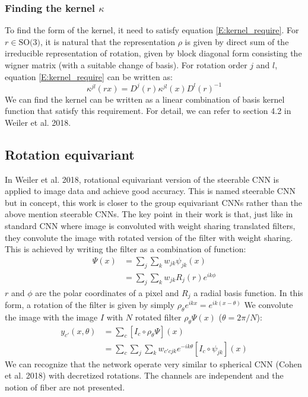 \documentclass{article}
\begin{document}
\subsubsection*{Finding the kernel $\kappa$}
To find the form of the kernel, it need to satisfy equation \ref{E:kernel_require}. For $r \in \text{SO(3)}$, 
it is natural that the representation $\rho$ is given by direct sum of the irreducible representation of rotation,
given by block diagonal form consisting the wigner matrix (with a suitable change of basis). 
For rotation order $j$ and $l$, equation \ref{E:kernel_require}
can be written as:
\begin{equation}
    \kappa^{jl}(rx) = D^{j}(r) \kappa^{jl}(x) D^l(r)^{-1}
\end{equation}
We can find the kernel can be written as a linear combination of basis kernel function that satisfy this requirement. 
For detail, we can refer to section 4.2 in Weiler et al. 2018.

\subsection*{Rotation equivariant}
In Weiler et al. 2018, rotational equivariant version of the steerable CNN is applied to image data and achieve good accuracy. 
This is named steerable CNN but in concept, this work is closer to the group equivariant CNNs rather than the above mention steerable CNNs. 
The key point in their work is that, just like in standard CNN where image is convoluted with weight sharing translated filters, 
they convolute the image with rotated version of the filter with weight sharing. 
This is achieved by writing the filter as a combination of function:
\begin{align*}
    \Psi(x) &= \sum_j \sum_k w_{jk}\psi_{jk}(x) \\
            &= \sum_j \sum_k w_{jk} R_j(r) e^{ik\phi}
\end{align*}
$r$ and $\phi$ are the polar coordinates of a pixel and $R_j$ a radial basis function. In this form, a rotation 
of the filter is given by simply $\rho_{\theta}e^{ikx} = e^{ik(x-\theta)}$
We convolute the image with the image $I$ with $N$ rotated filter $\rho_{\theta}\Psi(x)$ ($\theta = 2\pi / N$):
\begin{align*}
    y_{c'}(x,\theta) &= \sum_c [ I_c \circ \rho_{\theta}\Psi ] (x) \\
        &= \sum_c \sum_j \sum_k w_{c'cjk} e^{-ik\theta} [I_c \circ \psi_{jk}](x)
\end{align*}
We can recognize that the network operate 
very similar to spherical CNN (Cohen et al. 2018) with decretized rotations. The channels are independent and the notion of fiber 
are not presented.
\end{document}
